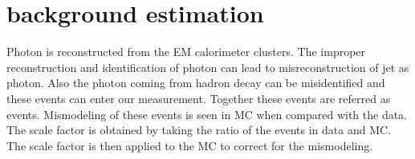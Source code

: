 \section{\hfake background estimation}
\label{sec:background-estimation-hfake}

Photon is reconstructed from the EM calorimeter clusters. The improper reconstruction and identification of photon can lead to misreconstruction of jet as photon. Also the photon coming from hadron decay can be misidentified and these events can enter our measurement. Together these events are referred as \hfake events. Mismodeling of these events is seen in MC when compared with the data. The scale factor is obtained by taking the ratio of the \hfake events in data and MC. The scale factor is then applied to the MC to correct for the mismodeling. 


